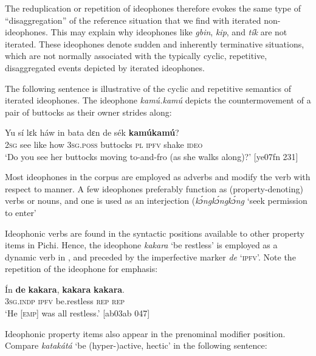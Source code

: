 The reduplication or repetition of ideophones therefore evokes the same type of “disaggregation” of the reference situation that we find with iterated non-ideophones. This may explain why ideophones like \textit{gbin}, \textit{kip}, and \textit{tík} are not iterated. These ideophones denote sudden and inherently terminative situations, which are not normally associated with the typically cyclic, repetitive, disaggregated events depicted by iterated ideophones. 



The following sentence is illustrative of the cyclic and repetitive semantics of iterated ideophones. The ideophone \textit{kamú.kamú} depicts the countermovement of a pair of buttocks as their owner strides along: 



\ea%
    \label{ex:key:1623}
    \gll Yu  sí  lɛk  háw    in    bata    dɛn  de  sék    \textbf{kamúkamú}?\\
\textsc{2sg}  see  like  how    \textsc{3sg.poss}  buttocks  \textsc{pl}  \textsc{ipfv}  shake  \textsc{ideo}\\

\glt ‘Do you see her buttocks moving to-and-fro (as she walks along)?’ [ye07fn 231]
\z

Most ideophones in the corpus are employed as adverbs and modify the verb with respect to manner. A few ideophones preferably function as (property-denoting) verbs or nouns, and one is used as an interjection (\textit{kɔ́ngkɔ́ngkɔ́ng} ‘seek permission to enter’

Ideophonic verbs are found in the syntactic positions available to other property items in Pichi. Hence, the ideophone \textit{kakara} ‘be restless’ is employed as a dynamic verb in , and preceded by the imperfective marker \textit{de} ‘\textsc{ipfv}’. Note the repetition of the ideophone for emphasis: 



\ea%
    \label{ex:key:1624}
    \gll \'{I}n    \textbf{de}  \textbf{kakara},    \textbf{kakara}  \textbf{kakara}.\\
\textsc{3sg.indp}  \textsc{ipfv}  be.restless  \textsc{rep}    \textsc{rep}\\

\glt ‘He [\textsc{emp}] was all restless.’ [ab03ab 047]
\z

Ideophonic property items also appear in the prenominal modifier position. Compare \textit{katakátá} ‘be (hyper-)active, hectic’ in the following sentence: 


